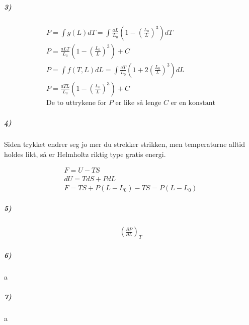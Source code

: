 \documentclass[11pt, A4paper, norsk]{article}
\begin{document}
			\subparagraph{3)}
				\begin{gather*}
P = \int g(L) dT = \int \frac{a L}{L_0} \left( 1 - \left( \frac{L_0}{L} \right)^3 \right) dT \\
P = \frac{a L T}{L_0} \left( 1 - \left( \frac{L_0}{L} \right)^3 \right) + C \\
P = \int f(T, L) dL = \int \frac{a T}{L_0} \left( 1 + 2 \left( \frac{L_0}{L} \right)^3 \right) dL \\
P = \frac{a T L}{L_0} \left( 1 - \left( \frac{L_0}{L} \right)^3 \right) + C \\
\text{De to uttrykene for $P$ er like så lenge $C$ er en konstant}
				\end{gather*}

			









			\subparagraph{4)}
				\begin{flushleft}
Siden trykket endrer seg jo mer du strekker strikken, men temperaturne alltid holdes likt, så er Helmholtz riktig type gratis energi.
				\end{flushleft}
				\begin{gather*}
F = U - TS \\
dU = T dS + P dL \\
F = T S + P (L - L_0) - T S = P (L - L_0)
				\end{gather*}









			\subparagraph{5)}
				\begin{gather*}
\left( \frac{\partial P}{\partial L} \right)_T
				\end{gather*}










			\subparagraph{6)}
				\begin{flushleft}
a
				\end{flushleft}









			\subparagraph{7)}
				\begin{flushleft}
a
				\end{flushleft}
\end{document}
